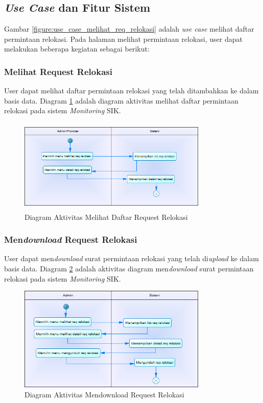\subsection{\textit{Use Case} dan Fitur Sistem}
Gambar \ref{figure:use_case_melihat_req_relokasi} adalah \textit{use case} melihat daftar permintaan relokasi. Pada halaman melihat permintaan relokasi, user dapat melakukan beberapa kegiatan sebagai berikut:
	\subsubsection{Melihat Request Relokasi}
	User dapat melihat daftar permintaan relokasi yang telah ditambahkan ke dalam basis data. Diagram \ref{figure:activity_melihat_req_relokasi} adalah diagram aktivitas melihat daftar permintaan relokasi pada sistem \textit{Monitoring} SIK.
	\begin{figure}[h]
	\centerline {\includegraphics[width=9cm,height=4.5cm]{bab4/ActivityDiagram_MelihatReqRelokasi.png}}
	\caption{Diagram Aktivitas Melihat Daftar Request Relokasi}
	\label{figure:activity_melihat_req_relokasi}
	\end{figure}
	
	\subsubsection{Men\textit{download} Request Relokasi}
	User dapat men\textit{download} surat permintaan relokasi yang telah di\textit{upload} ke dalam basis data. Diagram \ref{figure:activity_mendownload_req_relokasi} adalah aktivitas diagram men\textit{download} surat permintaan relokasi pada sistem \textit{Monitoring} SIK.
	\begin{figure}[h]
	\centerline
	{\includegraphics[width=9cm,height=5cm]{bab4/ActivityDiagram_DownloadReqRelokasi.png}}
	\caption{Diagram Aktivitas Mendownload Request Relokasi}
	\label{figure:activity_mendownload_req_relokasi}
	\end{figure}

